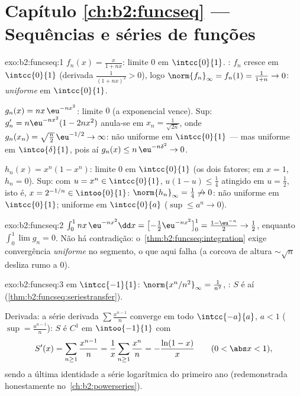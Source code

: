 \section*{Capítulo \ref{ch:b2:funcseq} --- Sequências e séries de
funções}

\begin{solution}{exo:b2:funcseq:1}
$f_n(x) = \frac{x}{1 + nx}$: limite  $0$ em $\intcc{0}{1}$.
: $f_n$ cresce em $\intcc{0}{1}$ (derivada
$\frac{1}{(1+nx)^2} > 0$), logo $\norm{f_n}_\infty = f_n(1) =
\frac{1}{1+n} \to 0$: \emph{uniforme} em $\intcc{0}{1}$.

$g_n(x) = nx\,\eu^{-nx^2}$: limite  $0$ (a exponencial
vence). Sup: $g_n' = n\eu^{-nx^2}(1 - 2nx^2)$ anula-se em $x_n =
\frac{1}{\sqrt{2n}}$, onde $g_n(x_n) = \sqrt{\frac n2}\,\eu^{-1/2}
\to \infty$: não uniforme em $\intcc{0}{1}$ --- mas uniforme em
$\intco{\delta}{1}$, pois aí $g_n(x) \leq n\,\eu^{-n\delta^2}
\to 0$.

$h_n(x) = x^n(1 - x^n)$: limite  $0$ em $\intcc{0}{1}$
(os dois fatores; em $x = 1$, $h_n = 0$). Sup: com $u = x^n \in
\intcc{0}{1}$, $u(1-u) \leq \frac14$ atingido em $u = \frac12$,
isto é, $x = 2^{-1/n} \in \intoo{0}{1}$: $\norm{h_n}_\infty =
\frac14 \not\to 0$: não uniforme em $\intcc{0}{1}$; uniforme em
$\intcc{0}{a}$ ($\sup \leq a^n \to 0$).
\end{solution}

\begin{solution}{exo:b2:funcseq:2}
$\int_0^1 nx\,\eu^{-nx^2}\dd x = \bigl[-\tfrac12
\eu^{-nx^2}\bigr]_0^1 = \frac{1 - \eu^{-n}}{2} \to \frac12$, enquanto
$\int_0^1 \lim g_n = 0$. Não há contradição:
o~\cref{thm:b2:funcseq:integration} exige convergência \emph{uniforme}
no segmento, o que aqui falha (a corcova de altura
$\sim\sqrt n$ desliza rumo a $0$).
\end{solution}

\begin{solution}{exo:b2:funcseq:3}
 em $\intcc{-1}{1}$: $\norm{x^n/n^2}_\infty =
\frac{1}{n^2}$, : $S$ é  aí
(\cref{thm:b2:funcseq:seriestransfer}).

Derivada: a série derivada $\sum \frac{x^{n-1}}{n}$ converge
 em todo $\intcc{-a}{a}$, $a < 1$ ($\sup =
\frac{a^{n-1}}{n}$): $S$ é $C^1$ em $\intoo{-1}{1}$ com
\[
S'(x) = \sum_{n\geq1} \frac{x^{n-1}}{n} = \frac1x \sum_{n\geq1}
\frac{x^n}{n} = -\frac{\ln(1 - x)}{x}
\qquad (0 < \abs x < 1),
\]
sendo a última identidade a série logarítmica do primeiro ano (redemonstrada
honestamente no~\cref{ch:b2:powerseries}).
\end{solution}

